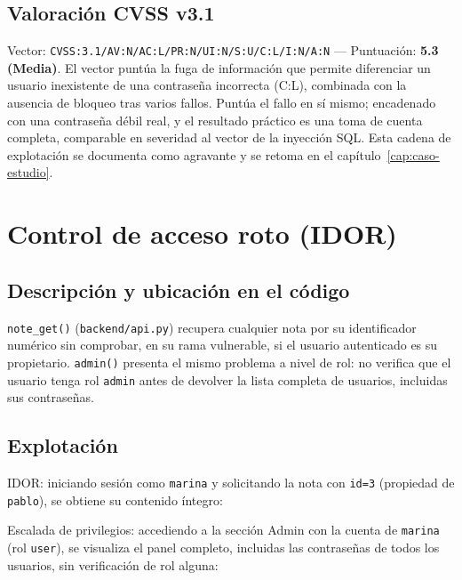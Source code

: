 \subsection{Valoración CVSS v3.1}

Vector: \texttt{CVSS:3.1/AV:N/AC:L/PR:N/UI:N/S:U/C:L/I:N/A:N} — Puntuación:
\textbf{5.3 (Media)}. El vector puntúa la fuga de información que permite
diferenciar un usuario inexistente de una contraseña incorrecta (C:L),
combinada con la ausencia de bloqueo tras varios fallos. Puntúa el fallo en sí mismo; encadenado con una
contraseña débil real, y el resultado
práctico es una toma de cuenta completa, comparable en severidad al vector
de la inyección SQL. Esta cadena de explotación se documenta como agravante
y se retoma en el capítulo~\ref{cap:caso-estudio}.

\section{Control de acceso roto (IDOR)}
\label{sec:idor}

\subsection{Descripción y ubicación en el código}

\verb|note_get()| (\texttt{backend/api.py}) recupera cualquier nota por su
identificador numérico sin comprobar, en su rama vulnerable, si el usuario
autenticado es su propietario. \verb|admin()| presenta el mismo problema a
nivel de rol: no verifica que el usuario tenga rol \texttt{admin} antes de
devolver la lista completa de usuarios, incluidas sus contraseñas.

\subsection{Explotación}

IDOR: iniciando sesión como \texttt{marina} y solicitando la nota con
\texttt{id=3} (propiedad de \texttt{pablo}), se obtiene su contenido
íntegro:


Escalada de privilegios: accediendo a la sección Admin con la cuenta de
\texttt{marina} (rol \texttt{user}), se visualiza el panel completo,
incluidas las contraseñas de todos los usuarios, sin verificación de rol
alguna:

